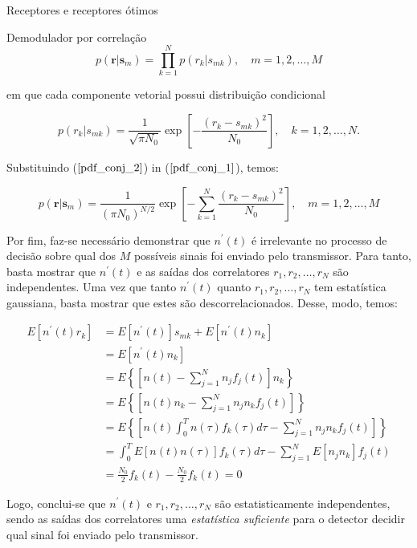 \documentclass[
  ignorenonframetext,
]{beamer}
\begin{document}
\begin{frame}{Receptores e receptores ótimos}
\begin{block}{Demodulador por correlação}
\begin{equation}\label{pdf_conj_1}
p\left(\mathbf{r}|\mathbf{s}_m\right)=\prod_{k=1}^N p\left(r_k|s_{m k}\right), \quad m=1,2, \ldots, M
\end{equation}

em que cada componente vetorial possui distribuição condicional

\begin{equation}\label{pdf_conj_2}
p\left(r_k|s_{m k}\right)=\frac{1}{\sqrt{\pi N_0}} \exp \left[-\frac{\left(r_k-s_{mk}\right)^2}{N_0}\right], \quad k=1,2, \ldots, N.
\end{equation}

Substituindo (\(\ref{pdf_conj_2}\)) in (\(\ref{pdf_conj_1}\)), temos:

\begin{equation}\label{pdf_conj_3}
p\left(\mathbf{r}|\mathbf{s}_m\right)=\frac{1}{\left(\pi N_0\right)^{N/2}} \exp \left[-\sum_{k=1}^N \frac{\left(r_k-s_{m k}\right)^2}{N_0}\right], \quad m=1,2, \ldots, M
\end{equation}

Por fim, faz-se necessário demonstrar que \(n^{\prime}(t)\) é
irrelevante no processo de decisão sobre qual dos \(M\) possíveis sinais
foi enviado pelo transmissor. Para tanto, basta mostrar que
\(n^{\prime}(t)\) e as saídas dos correlatores \(r_1, r_2, \dots, r_N\)
são independentes. Uma vez que tanto \(n^{\prime}(t)\) quanto
\(r_1, r_2, \dots, r_N\) tem estatística gaussiana, basta mostrar que
estes são descorrelacionados. Desse, modo, temos:

\[\begin{aligned} 
E\left[n^{\prime}(t) r_k\right] &= E\left[n^{\prime}(t)\right] s_{m k}+E\left[n^{\prime}(t) n_k\right] \\
&=E\left[n^{\prime}(t) n_k\right] \\ 
&=E\left\{\left[n(t)-\sum_{j=1}^N n_j f_j(t)\right] n_k\right\} \\ 
&=E\left\{\left[n(t)n_k-\sum_{j=1}^N n_j n_k f_j(t)\right] \right\} \\ 
&=E\left\{\left[n(t)\int_0^T n(\tau) f_k(\tau) d\tau -\sum_{j=1}^N n_j n_k f_j(t)\right]  \right\} \\
&=\int_0^T E[n(t) n(\tau)] f_k(\tau) d \tau-\sum_{j=1}^N E\left[n_j n_k\right] f_j(t) \\ 
&=\frac{N_0}{2} f_k(t)-\frac{N_0}{2} f_k(t)=0
\end{aligned}\]

Logo, conclui-se que \(n^{\prime}(t)\) e \(r_1, r_2, \dots, r_N\) são
estatisticamente independentes, sendo as saídas dos correlatores uma
\emph{estatística suficiente} para o detector decidir qual sinal foi
enviado pelo transmissor.
\end{block}


\end{frame}
\end{document}
